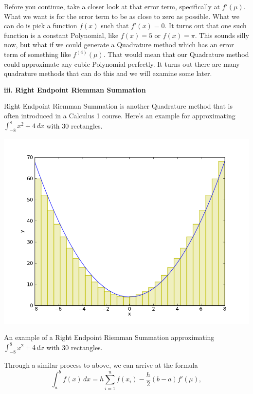 \documentclass[12pt]{article}
\newcommand{\newLine}{\vspace{5mm}}
\newcommand{\nextsubsection}[1]{\newLine \noindent \large \textbf{#1} \normalsize}
\newcommand{\integral}[3]{\text{$\int^{#2}_{#1} #3\,dx$}}
\newcommand{\summation}[3]{\text{$\sum^{#2}_{#1} #3$}}
\begin{document}
Before you continue, take a closer look at that error term, specifically at $f'(\mu)$. What we want is for the error term to be as close to zero as possible. What we can do is pick a function $f(x)$ such that $f'(x) = 0$. It turns out that one such function is a constant Polynomial, like $f(x) = 5$ or $f(x) = \pi$. This sounds silly now, but what if we could generate a Quadrature method which has an error term of something like $f^{(4)}(\mu)$. That would mean that our Quadrature method could approximate any cubic Polynomial perfectly. It turns out there are many quadrature methods that can do this and we will examine some later. 

\nextsubsection{iii. Right Endpoint Riemman Summation}

\newLine Right Endpoint Riemman Summation is another Quadrature method that is often introduced in a Calculus 1 course. Here's an example for approximating $\integral{-8}{8}{x^2+4}$ with 30 rectangles.

\begin{center} \includegraphics[scale = 0.5]{parabolaRightRIemman.png} 

\small An example of a Right Endpoint Riemman Summation approximating $\integral{-8}{8}{x^2+4}$ with 30 rectangles.\normalsize
\end{center}

Through a similar process to above, we can arrive at the formula
\begin{equation*} 
\integral{a}{b}{f(x)} = h\summation{i = 1}{n}{f(x_i)} - \frac{h}{2}(b-a)f'(\mu),
\end{equation*}
\end{document}
